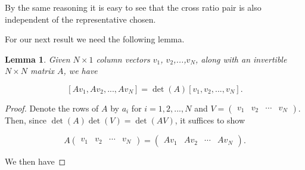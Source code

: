 \documentclass{amsart}
\theoremstyle{theorem}
\theoremstyle{lemma}
\newtheorem{lemma}{Lemma}
\theoremstyle{definition}
\begin{document}
By the same reasoning it is easy to see that the cross ratio pair is also independent of the representative chosen.

For our next result we need the following lemma.

\begin{lemma}
Given $N \times 1$ column vectors $v_1$, $v_2$,...,$v_N$,  along with an invertible $N \times N$ matrix $A$, we have

$$[Av_1, Av_2,..., Av_N]=\det(A)[v_1, v_2,..., v_N].$$

\end{lemma}

\begin{proof}
Denote the rows of $A$ by $a_i$ for $i=1,2,...,N$ and $V= \begin{pmatrix}v_1 & v_2 & \cdots & v_N \end{pmatrix}$. Then, since $\det(A)\det(V)=\det(AV)$, it suffices to show 

$$A\begin{pmatrix}v_1 & v_2 & \cdots & v_N \end{pmatrix}=\begin{pmatrix}Av_1 & Av_2 & \cdots & Av_N \end{pmatrix}.$$

We then have 


\end{proof}
\end{document}

